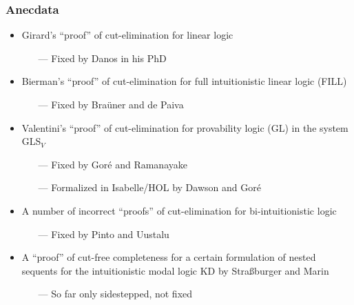 \documentclass{beamer}
\begin{document}
\begin{frame}
  \frametitle{Anecdata}

  \begin{itemize}
  \item Girard's ``proof'' of cut-elimination for linear logic
    \begin{itemize}
    \item[---] Fixed by Danos in his PhD
    \end{itemize}
  \item Bierman's ``proof'' of cut-elimination for full intuitionistic
    linear logic (FILL)
    \begin{itemize}
    \item[---] Fixed by Bra\"uner and de Paiva
    \end{itemize}
  \item Valentini's ``proof'' of cut-elimination for provability logic
    (GL) in the system GLS$_V$
    \begin{itemize}
    \item[---] Fixed by Gor\'e and Ramanayake
    \item[---] Formalized in Isabelle/HOL by Dawson and Gor\'e
    \end{itemize}
  \item A number of incorrect ``proofs'' of cut-elimination for
    bi-intuitionistic logic
    \begin{itemize}
    \item[---] Fixed by Pinto and Uustalu
    \end{itemize}
  \item A ``proof'' of cut-free completeness for a certain formulation
    of nested sequents for the intuitionistic modal logic KD by
    Stra{\ss}burger and Marin
    \begin{itemize}
    \item[---] So far only sidestepped, not fixed
    \end{itemize}
  \end{itemize}
\end{frame}
\end{document}
